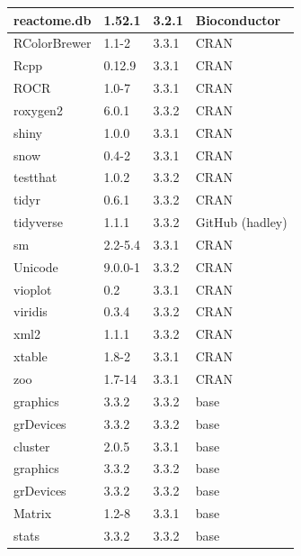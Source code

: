 \begin{longtable}{|llll|}
\hline
reactome.db  & 1.52.1         & 3.2.1 & Bioconductor    \\
\hline  \rowcolor{gray!25}
RColorBrewer & 1.1-2          & 3.3.1 & CRAN            \\
\hline
Rcpp         & 0.12.9         & 3.3.1 & CRAN            \\
\hline  \rowcolor{gray!25}
ROCR         & 1.0-7          & 3.3.1 & CRAN            \\
\hline
roxygen2     & 6.0.1          & 3.3.2 & CRAN            \\
\hline  \rowcolor{gray!25}
shiny        & 1.0.0          & 3.3.1 & CRAN            \\
\hline
snow         & 0.4-2          & 3.3.1 & CRAN            \\
\hline  \rowcolor{gray!25}
testthat     & 1.0.2          & 3.3.2 & CRAN            \\
\hline
tidyr        & 0.6.1          & 3.3.2 & CRAN            \\
\hline  \rowcolor{gray!25}
tidyverse    & 1.1.1          & 3.3.2 & GitHub (hadley) \\
\hline
sm           & 2.2-5.4        & 3.3.1 & CRAN            \\
\hline  \rowcolor{gray!25}
Unicode      & 9.0.0-1        & 3.3.2 & CRAN            \\
\hline
vioplot      & 0.2            & 3.3.1 & CRAN            \\
\hline  \rowcolor{gray!25}
viridis      & 0.3.4          & 3.3.2 & CRAN            \\
\hline
xml2         & 1.1.1          & 3.3.2 & CRAN            \\
\hline  \rowcolor{gray!25}
xtable       & 1.8-2          & 3.3.1 & CRAN            \\
\hline
zoo          & 1.7-14         & 3.3.1 & CRAN            \\
\hline  \rowcolor{gray!25}
graphics     & 3.3.2          & 3.3.2 & base            \\
\hline
grDevices    & 3.3.2          & 3.3.2 & base            \\
\hline  \rowcolor{gray!25}
cluster      & 2.0.5          & 3.3.1 & base            \\
\hline
graphics     & 3.3.2          & 3.3.2 & base            \\
\hline  \rowcolor{gray!25}
grDevices    & 3.3.2          & 3.3.2 & base            \\
\hline
Matrix       & 1.2-8          & 3.3.1 & base            \\
\hline  \rowcolor{gray!25}
stats        & 3.3.2          & 3.3.2 & base            \\
\hline
\end{longtable}


